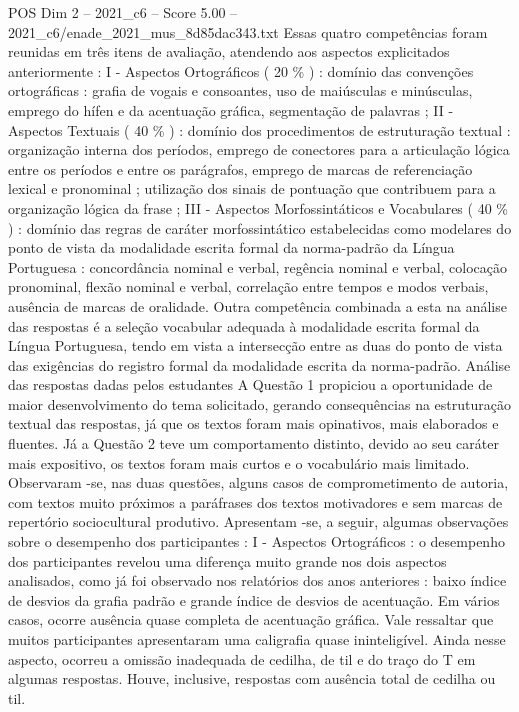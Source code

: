 \begin{textsample}{POS Dim 2 – 2021\_c6 – Score 5.00 – 2021\_c6/enade\_2021\_mus\_8d85dac343.txt}
Essas quatro competências foram reunidas em três itens de avaliação, atendendo aos aspectos explicitados anteriormente : I - Aspectos Ortográficos ( 20 \% ) : domínio das convenções ortográficas : grafia de vogais e consoantes, uso de maiúsculas e minúsculas, emprego do hífen e da acentuação gráfica, segmentação de palavras ; II - Aspectos Textuais ( 40 \% ) : domínio dos procedimentos de estruturação textual : organização interna dos períodos, emprego de conectores para a articulação lógica entre os períodos e entre os parágrafos, emprego de marcas de referenciação lexical e pronominal ; utilização dos sinais de pontuação que contribuem para a organização lógica da frase ; III - Aspectos Morfossintáticos e Vocabulares ( 40 \% ) : domínio das regras de caráter morfossintático estabelecidas como modelares do ponto de vista da modalidade escrita formal da norma-padrão da Língua Portuguesa : concordância nominal e verbal, regência nominal e verbal, colocação pronominal, flexão nominal e verbal, correlação entre tempos e modos verbais, ausência de marcas de oralidade.
Outra competência combinada a esta na análise das respostas é a seleção vocabular adequada à modalidade escrita formal da Língua Portuguesa, tendo em vista a intersecção entre as duas do ponto de vista das exigências do registro formal da modalidade escrita da norma-padrão.
Análise das respostas dadas pelos estudantes A Questão 1 propiciou a oportunidade de maior desenvolvimento do tema solicitado, gerando consequências na estruturação textual das respostas, já que os textos foram mais opinativos, mais elaborados e fluentes.
Já a Questão 2 teve um comportamento distinto, devido ao seu caráter mais expositivo, os textos foram mais curtos e o vocabulário mais limitado.
Observaram -se, nas duas questões, alguns casos de comprometimento de autoria, com textos muito próximos a paráfrases dos textos motivadores e sem marcas de repertório sociocultural produtivo.
Apresentam -se, a seguir, algumas observações sobre o desempenho dos participantes : I - Aspectos Ortográficos : o desempenho dos participantes revelou uma diferença muito grande nos dois aspectos analisados, como já foi observado nos relatórios dos anos anteriores : baixo índice de desvios da grafia padrão e grande índice de desvios de acentuação.
Em vários casos, ocorre ausência quase completa de acentuação gráfica.
Vale ressaltar que muitos participantes apresentaram uma caligrafia quase ininteligível.
Ainda nesse aspecto, ocorreu a omissão inadequada de cedilha, de til e do traço do T em algumas respostas.
Houve, inclusive, respostas com ausência total de cedilha ou til.

\end{textsample}
